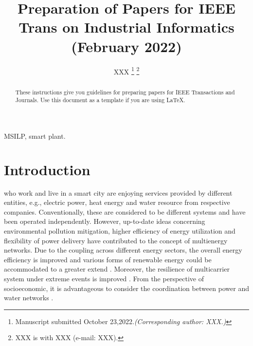 \documentclass[journal,twoside,web]{ieeecolor}
\begin{document}
\title{Preparation of Papers for IEEE Trans on Industrial Informatics (February 2022)}
\author{XXX
\thanks{Manuscript submitted October 23,2022.\textit{(Corresponding author: XXX.)}}
\thanks{XXX is with XXX (e-mail: XXX).}}

\maketitle

\begin{abstract}
These instructions give you guidelines for preparing papers for 
IEEE Transactions and Journals. Use this document as a template if you are 
using \LaTeX. 
\end{abstract}

\begin{IEEEkeywords}
MSILP, smart plant.
\end{IEEEkeywords}

\section{Introduction}\label{sec:introduction}
 who work and live in a smart city \cite{smartcity} are enjoying services provided by different entities, e.g., electric power, heat energy and water resource from respective companies.
Conventionally, these are considered to be different systems and have been operated independently.
However, up-to-date ideas concerning environmental pollution mitigation, higher efficiency of energy utilization and flexibility of power delivery have contributed to the concept of multienergy networks.
Due to the coupling across different energy sectors, the overall energy efficiency is improved and various forms of renewable energy could be accommodated to a greater extend \cite{prodIErev}.
Moreover, the resilience of multicarrier system under extreme events is improved \cite{E1}.
From the perspective of socioeconomic, it is advantageous to consider the coordination between power and water networks \cite{E8_OWPF}.

\end{document}
